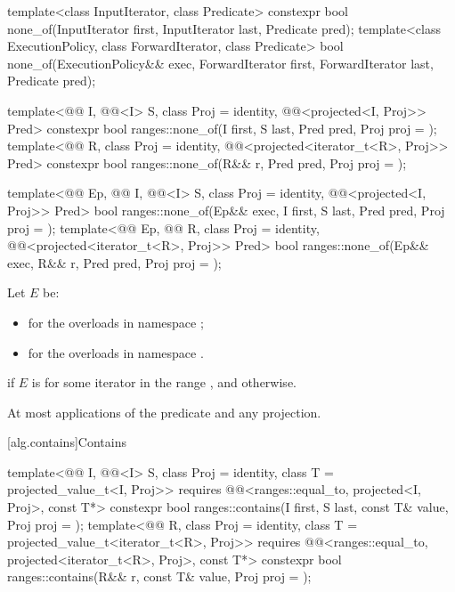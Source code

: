 %
\begin{itemdecl}
template<class InputIterator, class Predicate>
  constexpr bool none_of(InputIterator first, InputIterator last, Predicate pred);
template<class ExecutionPolicy, class ForwardIterator, class Predicate>
  bool none_of(ExecutionPolicy&& exec, ForwardIterator first, ForwardIterator last,
               Predicate pred);

template<@@ I, @@<I> S, class Proj = identity,
         @@<projected<I, Proj>> Pred>
  constexpr bool ranges::none_of(I first, S last, Pred pred, Proj proj = {});
template<@@ R, class Proj = identity,
         @@<projected<iterator_t<R>, Proj>> Pred>
  constexpr bool ranges::none_of(R&& r, Pred pred, Proj proj = {});

template<@@ Ep, @@ I, @@<I> S,
         class Proj = identity, @@<projected<I, Proj>> Pred>
  bool ranges::none_of(Ep&& exec, I first, S last, Pred pred, Proj proj = {});
template<@@ Ep, @@ R, class Proj = identity,
         @@<projected<iterator_t<R>, Proj>> Pred>
  bool ranges::none_of(Ep&& exec, R&& r, Pred pred, Proj proj = {});
\end{itemdecl}

\begin{itemdescr}
\pnum
Let $E$ be:
\begin{itemize}
\item
   for the overloads in namespace ;
\item
  for the overloads in namespace .
\end{itemize}

\pnum
\returns
{} if $E$ is 
for some iterator  in the range , and
 otherwise.

\pnum
\complexity
At most  applications of the predicate and any projection.
\end{itemdescr}

[alg.contains]{Contains}

%
\begin{itemdecl}
template<@@ I, @@<I> S, class Proj = identity,
         class T = projected_value_t<I, Proj>>
  requires @@<ranges::equal_to, projected<I, Proj>, const T*>
  constexpr bool ranges::contains(I first, S last, const T& value, Proj proj = {});
template<@@ R, class Proj = identity, class T = projected_value_t<iterator_t<R>, Proj>>
  requires @@<ranges::equal_to, projected<iterator_t<R>, Proj>, const T*>
  constexpr bool ranges::contains(R&& r, const T& value, Proj proj = {});
\end{itemdecl}

